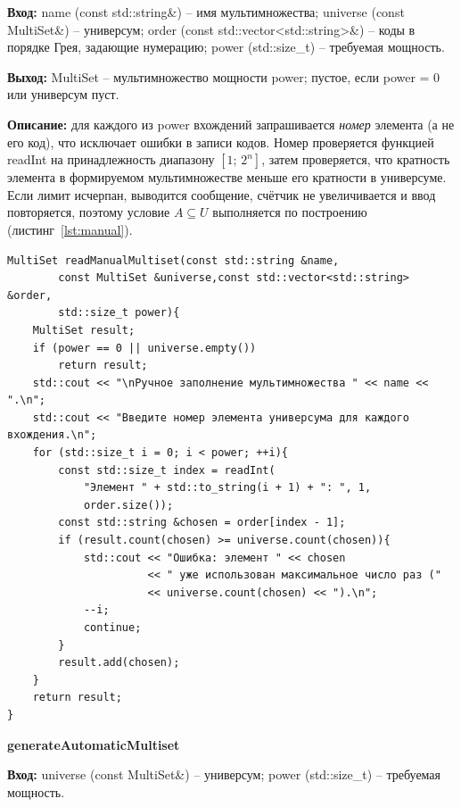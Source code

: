 \documentclass[14pt,a4paper]{extreport}
\newcommand{\code}[1]{{\ttfamily #1}}
\begin{document}
\textbf{Вход:} \code{name} (\code{const std::string\&}) -- имя мультимножества; \code{universe} (\code{const MultiSet\&}) -- универсум; \code{order} (\code{const std::vector<std::string>\&}) -- коды в порядке Грея, задающие нумерацию; \code{power} (\code{std::size\_t}) -- требуемая мощность.

\textbf{Выход:} \code{MultiSet} -- мультимножество мощности \code{power}; пустое, если \code{power = 0} или универсум пуст.

\textbf{Описание:} для каждого из \code{power} вхождений запрашивается \emph{номер} элемента (а не его код), что исключает ошибки в записи кодов. Номер проверяется функцией \code{readInt} на принадлежность диапазону $[1;\,2^n]$, затем проверяется, что кратность элемента в формируемом мультимножестве меньше его кратности в универсуме. Если лимит исчерпан, выводится сообщение, счётчик не увеличивается и ввод повторяется, поэтому условие $A\subseteq U$ выполняется по построению (листинг~\ref{lst:manual}).

\begin{listing}[H]
\caption{Функция \code{readManualMultiset} (input.cpp)}\label{lst:manual}
\begin{lstlisting}
MultiSet readManualMultiset(const std::string &name, 
        const MultiSet &universe,const std::vector<std::string> &order, 
        std::size_t power){
    MultiSet result;
    if (power == 0 || universe.empty())
        return result;
    std::cout << "\nРучное заполнение мультимножества " << name << ".\n";
    std::cout << "Введите номер элемента универсума для каждого вхождения.\n";
    for (std::size_t i = 0; i < power; ++i){
        const std::size_t index = readInt(
            "Элемент " + std::to_string(i + 1) + ": ", 1,
            order.size());
        const std::string &chosen = order[index - 1];
        if (result.count(chosen) >= universe.count(chosen)){
            std::cout << "Ошибка: элемент " << chosen
                      << " уже использован максимальное число раз ("
                      << universe.count(chosen) << ").\n";
            --i;
            continue;
        }
        result.add(chosen);
    }
    return result;
}
\end{lstlisting}
\end{listing}

\textbf{generateAutomaticMultiset}

\textbf{Вход:} \code{universe} (\code{const MultiSet\&}) -- универсум; \code{power} (\code{std::size\_t}) -- требуемая мощность.
\end{document}
